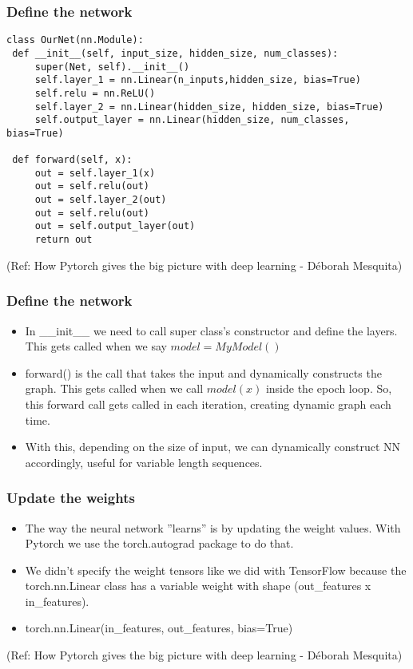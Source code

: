 \begin{frame}[fragile] \frametitle{Define the network}
 \begin{lstlisting}
class OurNet(nn.Module):
 def __init__(self, input_size, hidden_size, num_classes):
     super(Net, self).__init__()
     self.layer_1 = nn.Linear(n_inputs,hidden_size, bias=True)
     self.relu = nn.ReLU()
     self.layer_2 = nn.Linear(hidden_size, hidden_size, bias=True)
     self.output_layer = nn.Linear(hidden_size, num_classes, bias=True)
 
 def forward(self, x):
     out = self.layer_1(x)
     out = self.relu(out)
     out = self.layer_2(out)
     out = self.relu(out)
     out = self.output_layer(out)
     return out
\end{lstlisting}

  {\tiny (Ref: How Pytorch gives the big picture with deep learning - Déborah Mesquita)}
\end{frame}

\begin{frame}[fragile] \frametitle{Define the network}
\begin{itemize}
\item In \_\_init\_\_ we need to call super class's constructor and define the layers. This gets called when we say $model = MyModel()$
\item forward() is the call that takes the input and dynamically constructs the graph. This gets called when we call $model(x)$ inside the epoch loop. So, this forward call gets called in each iteration, creating dynamic graph each time.
\item With this, depending on the size of input, we can dynamically construct NN accordingly, useful for variable length sequences.
\end{itemize}

\end{frame}


\begin{frame}[fragile] \frametitle{Update the weights}
\begin{itemize}
\item The way the neural network ''learns'' is by updating the weight values. With Pytorch we use the torch.autograd package to do that.
\item We didn’t specify the weight tensors like we did with TensorFlow because the torch.nn.Linear class has a variable weight with shape (out\_features x in\_features).
\item torch.nn.Linear(in\_features, out\_features, bias=True)
\end{itemize}

  {\tiny (Ref: How Pytorch gives the big picture with deep learning - Déborah Mesquita)}
\end{frame}

